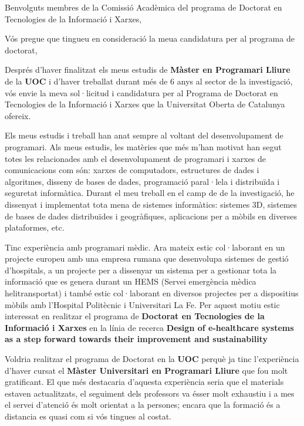 
%
%


\date{\today}
\opening{Benvolguts membres de la Comissió Acadèmica del programa de Doctorat en Tecnologies de la Informació i Xarxes,}
\closing{Vós pregue que tingueu en consideració la meua candidatura per al programa de doctorat,}




\makelettertitle

Després d'haver finalitzat els meus estudis de \textbf{Màster en Programari Lliure} de la \textbf{UOC} i d'haver treballat durant més de 6 anys al sector de la investigació, vós envie la meva sol·licitud i candidatura per al Programa de Doctorat en Tecnologies de la Informació i Xarxes que la Universitat Oberta de Catalunya ofereix.

Els meus estudis i treball han anat sempre al voltant del desenvolupament de programari. Als meus estudis, les matèries que més m'han motivat han segut totes les relacionades amb el desenvolupament de programari i xarxes de comunicacions com són: xarxes de computadors, estructures de dades i algoritmes, disseny de bases de dades, programació paral·lela i distribuïda i seguretat informàtica. Durant el meu treball en el camp de de la investigació, he dissenyat i implementat tota mena de sistemes informàtics: sistemes 3D, sistemes de bases de dades distribuïdes i geogràfiques, aplicacions per a mòbils en diverses plataformes, etc.

Tinc experiència amb programari mèdic. Ara mateix estic col·laborant en un projecte europeu amb una empresa rumana que desenvolupa sistemes de gestió d'hospitals, a un projecte per a dissenyar un sistema per a gestionar tota la informació que es genera durant un HEMS (Servei emergència mèdica helitransportat) i també estic col·laborant en diversos projectes per a dispositius mòbils amb l'Hospital Politècnic i Universitari La Fe. Per aquest motiu estic interessat en realitzar el programa de \textbf{Doctorat en Tecnologies de la Informació i Xarxes} en la línia de recerca \textbf{Design of e-healthcare systems as a step forward towards their improvement and sustainability} 

Voldria realitzar el programa de Doctorat en la \textbf{UOC} perquè ja tinc l'experiència d'haver cursat el \textbf{Màster Universitari en Programari Lliure} que fou molt gratificant. El que més destacaria d'aquesta experiència seria que el materials estaven actualitzats, el seguiment dels professors va ésser molt exhaustiu i a mes el servei d'atenció és molt orientat a la persones; encara que la formació és a distancia es quasi com si vós tingues al costat. 

\makeletterclosing

\clearpage
